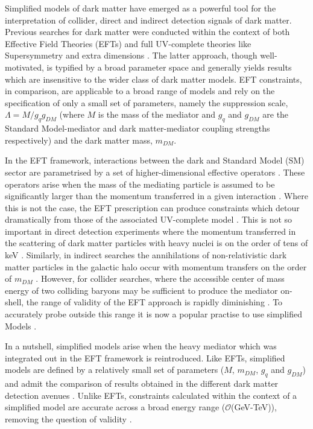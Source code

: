 \begin{flushleft}
Simplified models of dark matter have emerged as a powerful tool for the interpretation of collider, direct and indirect detection signals of dark matter. Previous searches for dark matter were conducted within the context of both Effective Field Theories (EFTs) \cite{Aad:1363019, ATLAS-CONF-2012-147, CMS-PAS-EXO-12-048, Buckley:2013jwa, Abdallah:1472683, MonoZ, MonoX} and full UV-complete theories like Supersymmetry \cite{ComppMSSM, Aad:2012ms, Aad:2012fqa, Aad:2014wea, SUSY_official_paper} and extra dimensions \cite{}. The latter approach, though well-motivated, is typified by a broad parameter space and generally yields results which are insensitive to the wider class of dark matter models. EFT constraints, in comparison, are applicable to a broad range of models and rely on the specification of only a small set of parameters, namely the suppression scale, $\Lambda = M/g_{q}g_{DM}$ (where $M$ is the mass of the mediator and $g_{q}$ and $g_{DM}$ are the Standard Model-mediator and dark matter-mediator coupling strengths respectively) and the dark matter mass, $m_{DM}$.

\hspace{1cm}In the EFT framework, interactions between the dark and Standard Model (SM) sector are parametrised by a set of higher-dimensional effective operators \cite{}. These operators arise when the mass of the mediating particle is assumed to be significantly larger than the momentum transferred in a given interaction \cite{}. Where this is not the case, the EFT prescription can produce constraints which detour dramatically from those of the associated UV-complete model \cite{Bai:2010hh, DMCons2, Fox:2011fx, Graesser:2011vj, An:2011ck}. This is not so important in direct detection experiments where the momentum transferred in the scattering of dark matter particles with heavy nuclei is on the order of tens of keV \cite{EFTDM, DMCons3}. Similarly, in indirect searches the annihilations of non-relativistic dark matter particles in the galactic halo occur with momentum transfers on the order of $m_{DM}$ \cite{}. However, for collider searches, where the accessible center of mass energy of two colliding baryons may be sufficient to produce the mediator on-shell, the range of validity of the EFT approach is rapidly diminishing \cite{}. 
To accurately probe outside this range it is now a popular practise to use simplified Models \cite{Buchmueller:2014yoa}.

\hspace{1cm}In a nutshell, simplified models arise when the heavy mediator which was integrated out in the EFT framework is reintroduced. Like EFTs, simplified models are defined by a relatively small set of parameters ($M$, $m_{DM}$, $g_{q}$ and $g_{DM}$) and admit the comparison of results obtained in the different dark matter detection avenues \cite{}. Unlike EFTs, constraints calculated within the context of a simplified model are accurate across a broad energy range ($\mathcal{O}$(GeV-TeV)), removing the question of validity \cite{}. 


\end{flushleft}

